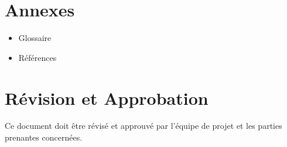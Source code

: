 \documentclass{article}
\begin{document}
\section{Annexes}
\begin{itemize}
    \item Glossaire
    \item Références
\end{itemize}

\section{Révision et Approbation}
Ce document doit être révisé et approuvé par l'équipe de projet et les parties prenantes concernées.
\end{document}
